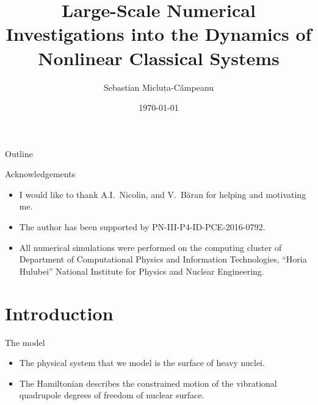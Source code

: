 \documentclass{beamer}
\title{Large-Scale Numerical Investigations into the Dynamics of Nonlinear Classical Systems}
\date{\today}
\author{Sebastian Micluța-Câmpeanu}
\institute{University of Bucharest}
\begin{document}
\maketitle


\begin{frame}{Outline}
  \tableofcontents[]
\end{frame}


\begin{frame}{Acknowledgements}
	\begin{itemize}
		\item I would like to thank A.I.~Nicolin, and V.~Băran for helping and motivating me.
		\item The author has been	supported by PN-III-P4-ID-PCE-2016-0792.
		\item All numerical simulations were performed on the computing cluster of
		Department of Computational Physics and Information Technologies,
		``Horia Hulubei'' National Institute for Physics and Nuclear Engineering.
	\end{itemize}
\end{frame}

\section{Introduction}


\begin{frame}{The model}
  \begin{itemize}
		\item The physical system that we model is the surface of heavy nuclei.
    \item The Hamiltonian describes the constrained motion of the vibrational quadrupole degrees of freedom of nuclear surface.
  \end{itemize}
\end{frame}

\end{document}
